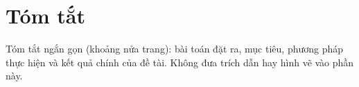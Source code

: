 \section*{Tóm tắt}
\thispagestyle{empty}

Tóm tắt ngắn gọn (khoảng nửa trang): bài toán đặt ra, mục tiêu, phương pháp thực hiện và kết quả chính của đề tài. Không đưa trích dẫn hay hình vẽ vào phần này.

\clearpage
